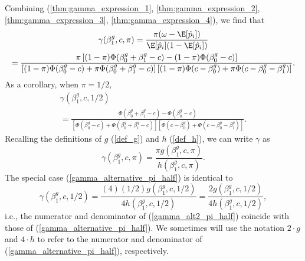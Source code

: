 \documentclass[12pt]{article}
\begin{document}
\begin{appendices}
Combining (\ref{thm:gamma_expression_1}, \ref{thm:gamma_expression_2}, \ref{thm:gamma_expression_3}, \ref{thm:gamma_expression_4}), we find that
\begin{multline}\label{gamma_alternative}
\gamma(\beta^g_1, c, \pi) = \frac{\pi(\omega - \E[\hat{p}_i])}{\E[\hat{p}_i](1 - \E[\hat{p}_i])} \\ = \frac{\pi \left[(1 - \pi) \Phi(\beta_0^g + \beta_1^g - c) - (1 - \pi) \Phi(\beta_0^g - c)\right]}{\left[(1-\pi)\Phi(\beta_0^g - c) + \pi \Phi(\beta^g_0 + \beta^g_1 - c) \right] \left[(1 - \pi) \Phi(c - \beta^g_0) + \pi\Phi(c - \beta_0^g - \beta_1^g) \right]}.
\end{multline}
As a corollary, when $\pi = 1/2$,
\begin{multline}\label{gamma_alternative_pi_half}
\gamma(\beta^g_1, c, 1/2)  \\ = \frac{\Phi(\beta_0^g + \beta_1^g - c) - \Phi(\beta_0^g - c) }{\left[\Phi(\beta_0^g - c) +\Phi(\beta^g_0 + \beta^g_1 - c)\right] \left[\Phi(c - \beta^g_0) + \Phi(c - \beta_0^g - \beta_1^g) \right]}.
\end{multline}
Recalling the definitions of $g$ (\ref{def_g}) and $h$ (\ref{def_h}), we can write $\gamma$ as
$$ \gamma(\beta^g_1, c, \pi) = \frac{\pi g(\beta^g_1, c, \pi)}{h(\beta^g_1, c,\pi)}.$$
The special case (\ref{gamma_alternative_pi_half}) is identical to
\begin{equation}\label{gamma_alt2_pi_half}
\gamma(\beta^g_1, c, 1/2) = \frac{(4)(1/2)g(\beta^g_1, c, 1/2)}{4 h(\beta^g_1, c, 1/2)} = \frac{2 g(\beta^g_1, c, 1/2)}{4h(\beta^g_1, c, 1/2)},
\end{equation}
i.e., the numerator and denominator of  (\ref{gamma_alt2_pi_half}) coincide with those of (\ref{gamma_alternative_pi_half}). We sometimes will use the notation $2\cdot g$ and $4\cdot h$ to refer to the numerator and denominator of (\ref{gamma_alternative_pi_half}), respectively.


\end{appendices}
\end{document}
